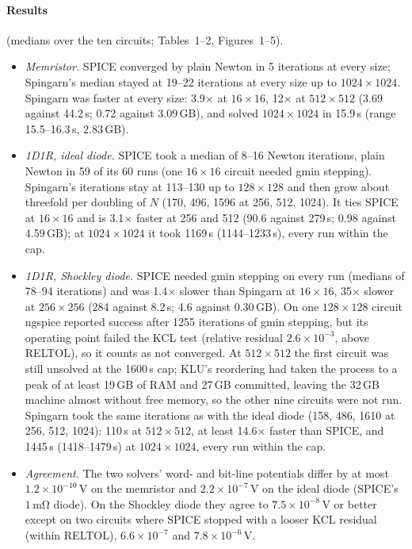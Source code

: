 \documentclass[11pt]{article}
\begin{document}
\paragraph{Results} (medians over the ten circuits; Tables~1--2, Figures~1--5).
\begin{itemize}
  \item \emph{Memristor.} SPICE converged by plain Newton in 5 iterations at every size; Spingarn's median stayed at 19--22
  iterations at every size up to $1024\times1024$. Spingarn was faster at every size: 3.9$\times$ at
  $16\times16$, 12$\times$ at $512\times512$ (3.69 against 44.2\,s; 0.72 against 3.09\,GB), and solved
  $1024\times1024$ in 15.9\,s (range 15.5--16.3\,s, 2.83\,GB).
  \item \emph{1D1R, ideal diode.} SPICE took a median of 8--16 Newton iterations, plain Newton in 59 of its 60 runs (one
  $16\times16$ circuit needed gmin stepping). Spingarn's iterations stay at 113--130 up to $128\times128$ and then grow
  about threefold per doubling of $N$ (170, 496, 1596 at 256, 512, 1024). It ties SPICE at $16\times16$ and is
  3.1$\times$ faster at 256 and 512 (90.6 against 279\,s; 0.98 against 4.59\,GB); at $1024\times1024$ it took
  1169\,s (1144--1233\,s), every run within the cap.
  \item \emph{1D1R, Shockley diode.} SPICE needed gmin stepping on every run (medians of 78--94 iterations) and was 1.4$\times$
  slower than Spingarn at $16\times16$, 35$\times$ slower at $256\times256$ (284 against 8.2\,s; 4.6 against
  0.30\,GB). On one $128\times128$ circuit ngspice reported success after 1255 iterations of gmin stepping, but its
  operating point failed the KCL test (relative residual $2.6\times10^{-3}$, above RELTOL), so it counts as not
  converged. At $512\times512$ the first circuit was still unsolved at the 1600\,s cap; KLU's reordering had taken the
  process to a peak of at least 19\,GB of RAM and 27\,GB committed, leaving the 32\,GB machine almost without free
  memory, so the other nine circuits were not run. Spingarn took the same iterations as with the ideal diode (158,
  486, 1610 at 256, 512, 1024): 110\,s at $512\times512$, at least 14.6$\times$ faster than SPICE, and 1445\,s
  (1418--1479\,s) at $1024\times1024$, every run within the cap.
  \item \emph{Agreement.} The two solvers' word- and bit-line potentials differ by at most $1.2\times10^{-10}$\,V on the
  memristor and $2.2\times10^{-7}$\,V on the ideal diode (SPICE's $1\,\mathrm{m\Omega}$ diode). On the Shockley diode
  they agree to $7.5\times10^{-8}$\,V or better except on two circuits where SPICE stopped with a looser KCL residual
  (within RELTOL), $6.6\times10^{-7}$ and $7.8\times10^{-6}$\,V.
\end{itemize}
\end{document}
